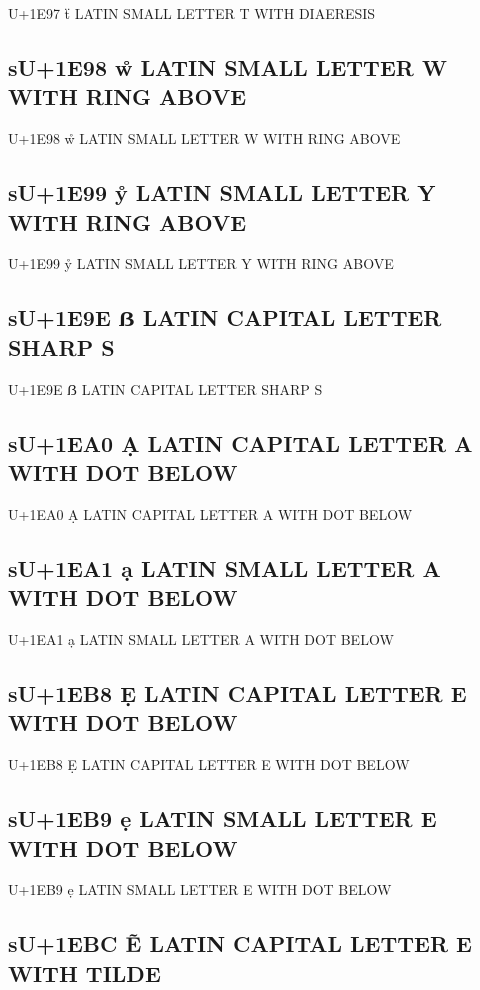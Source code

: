 U+1E97 ẗ LATIN SMALL LETTER T WITH DIAERESIS

\subsection{sU+1E98 ẘ LATIN SMALL LETTER W WITH RING ABOVE}

U+1E98 ẘ LATIN SMALL LETTER W WITH RING ABOVE

\subsection{sU+1E99 ẙ LATIN SMALL LETTER Y WITH RING ABOVE}

U+1E99 ẙ LATIN SMALL LETTER Y WITH RING ABOVE

\subsection{sU+1E9E ẞ LATIN CAPITAL LETTER SHARP S}

U+1E9E ẞ LATIN CAPITAL LETTER SHARP S

\subsection{sU+1EA0 Ạ LATIN CAPITAL LETTER A WITH DOT BELOW}

U+1EA0 Ạ LATIN CAPITAL LETTER A WITH DOT BELOW

\subsection{sU+1EA1 ạ LATIN SMALL LETTER A WITH DOT BELOW}

U+1EA1 ạ LATIN SMALL LETTER A WITH DOT BELOW

\subsection{sU+1EB8 Ẹ LATIN CAPITAL LETTER E WITH DOT BELOW}

U+1EB8 Ẹ LATIN CAPITAL LETTER E WITH DOT BELOW

\subsection{sU+1EB9 ẹ LATIN SMALL LETTER E WITH DOT BELOW}

U+1EB9 ẹ LATIN SMALL LETTER E WITH DOT BELOW

\subsection{sU+1EBC Ẽ LATIN CAPITAL LETTER E WITH TILDE}

